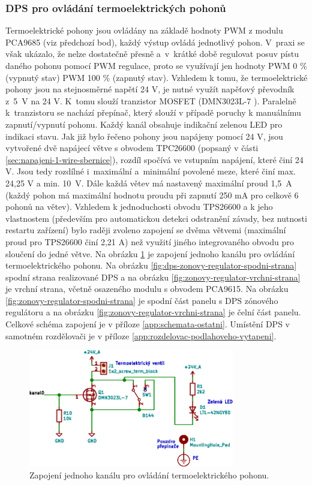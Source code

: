 \subsubsection{DPS pro ovládání termoelektrických pohonů}
Termoelektrické pohony jsou ovládány na základě hodnoty PWM z modulu PCA9685 (viz předchozí bod), každý výstup ovládá jednotlivý pohon. V~praxi se však ukázalo, že nelze dostatečně přesně a~v~krátké době regulovat posuv pístu daného pohonu pomocí PWM regulace, proto se využívají jen hodnoty PWM 0 \% (vypnutý stav) PWM 100 \% (zapnutý stav). Vzhledem k tomu, že termoelektrické pohony jsou na stejnosměrné napětí 24 V, je nutné využít napěťový převodník z~5~V na 24 V. K~tomu slouží tranzistor MOSFET (DMN3023L-7 \cite{dmn3023l}). Paralelně k~tranzistoru se nachází přepínač, který slouží v případě poruchy k manuálnímu zapnutí/vypnutí pohonu.  Každý kanál obsahuje indikační zelenou LED pro indikaci stavu. Jak již bylo řečeno pohony jsou napájeny pomocí 24 V, jsou vytvořené dvě napájecí větve s obvodem TPC26600 (popsaný v části \ref{sec:napajeni-1-wire-sbernice}), rozdíl spočívá ve vstupním napájení, které činí 24 V. Jsou tedy rozdílné i~maximální a~minimální povolené meze, které činí max. 24,25 V a min. 10~V. Dále každá větev má nastavený maximální proud 1,5~A (každý pohon má maximální hodnotu proudu při zapnutí 250 mA pro celkově 6 pohonů na větev). Vzhledem k jednoduchosti obvodu TPS26600 a k jeho vlastnostem (především pro automatickou detekci odstranění závady, bez nutnosti restartu zařízení) bylo raději zvoleno zapojení se dvěma větvemi (maximální proud pro TPS26600 činí 2,21 A) než využití jiného integrovaného obvodu pro sloučení do jedné větve. Na obrázku \ref{fig:zonovy-regulator-mosfet-pwm-1-kanal} je zapojení jednoho kanálu pro ovládání termoelektrického pohonu.  Na obrázku \ref{fig:dps-zonovy-regulator-spodni-strana} spodní strana realizované DPS a na obrázku \ref{fig:zonovy-regulator-vrchni-strana} je vrchní strana, včetně osazeného modulu s obvodem PCA9615. Na obrázku \ref{fig:zonovy-regulator-spodni-strana} je spodní část panelu s DPS zónového regulátoru a na obrázku \ref{fig:zonovy-regulator-vrchni-strana} je čelní část panelu. Celkové schéma zapojení je v příloze \ref{app:schemata-ostatni}. Umístění DPS v samotném rozdělovači je v příloze \ref{app:rozdelovac-podlahoveho-vytapeni}.


\begin{figure}[H]
    \centering
    \includegraphics[width=0.8\textwidth]{images/svg/kicad/zonovy-regulator-mosfet-pwm-1-kanal.eps}
    \caption{Zapojení jednoho kanálu pro ovládání termoelektrického pohonu.}
    \label{fig:zonovy-regulator-mosfet-pwm-1-kanal}
\end{figure}

